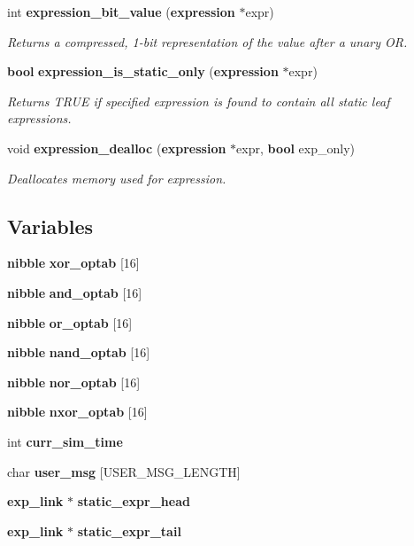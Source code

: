 \begin{CompactItemize}
int {\bf expression\_\-bit\_\-value} ({\bf expression} $\ast$expr)
\begin{CompactList}\small\item\em Returns a compressed, 1-bit representation of the value after a unary OR. \item\end{CompactList}\item 
{\bf bool} {\bf expression\_\-is\_\-static\_\-only} ({\bf expression} $\ast$expr)
\begin{CompactList}\small\item\em Returns TRUE if specified expression is found to contain all static leaf expressions. \item\end{CompactList}\item 
void {\bf expression\_\-dealloc} ({\bf expression} $\ast$expr, {\bf bool} exp\_\-only)
\begin{CompactList}\small\item\em Deallocates memory used for expression. \item\end{CompactList}\end{CompactItemize}
\subsection*{Variables}
\begin{CompactItemize}
\item 
{\bf nibble} {\bf xor\_\-optab} [16]
\item 
{\bf nibble} {\bf and\_\-optab} [16]
\item 
{\bf nibble} {\bf or\_\-optab} [16]
\item 
{\bf nibble} {\bf nand\_\-optab} [16]
\item 
{\bf nibble} {\bf nor\_\-optab} [16]
\item 
{\bf nibble} {\bf nxor\_\-optab} [16]
\item 
int {\bf curr\_\-sim\_\-time}
\item 
char {\bf user\_\-msg} [USER\_\-MSG\_\-LENGTH]
\item 
{\bf exp\_\-link} $\ast$ {\bf static\_\-expr\_\-head}
\item 
{\bf exp\_\-link} $\ast$ {\bf static\_\-expr\_\-tail}
\end{CompactItemize}


